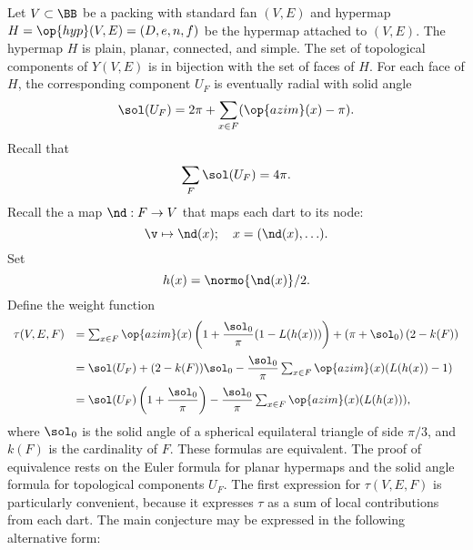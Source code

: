 Let $V\subset \BB$ be a packing with
standard fan $(V,E)$ and hypermap $H=\op{hyp}(V,E)=(D,e,n,f)$
be the hypermap attached to $(V,E)$.
The hypermap $H$ is plain, planar, connected, and simple.
The set of topological components of $Y(V,E)$ is in bijection with
the set of faces of $H$.  
%
For each face of $H$, the corresponding component $U_F$
is eventually radial with solid
angle
%
\begin{displaymath}
\sol(U_F) = 2\pi + \sum_{x\in F} (\op{azim}(x) -\pi).
\end{displaymath}
Recall that
\begin{displaymath}\sum_{F} \sol(U_F) = 4\pi.\end{displaymath}
Recall the a map $\nd:F\to V$ that maps each dart to its node:
\begin{displaymath}
\v \mapsto \nd(x); \quad   x = (\nd(x),\ldots).
\end{displaymath}
Set 
\begin{displaymath}h(x) = \normo{\nd(x)}/2.\end{displaymath}
Define the weight function
\begin{equation}
\begin{array}{lll}
  \tau(V,E,F) &=\sum_{x\in F} \op{azim}(x)
  \left(1 + \dfrac{\sol_0}{\pi}(1- L(h(x)))\right) 
  + \left(\pi+{\sol_0}\right) (2- k(F))\vspace{6pt}\\
  &= \sol(U_F) + (2- k(F))\sol_0 - \dfrac{\sol_0}{\pi}
\sum_{x\in F}\op{azim}(x) (L(h(x)) - 1)\vspace{6pt}\\
  &= \sol(U_F) \left( 1 + \dfrac{\sol_0}{\pi}\right) 
- \dfrac{\sol_0}{\pi} \sum_{x\in F} \op{azim}(x)(L(h(x))),\\
\end{array}
\end{equation}
where $\sol_0$ is the solid angle of a spherical equilateral triangle
of side $\pi/3$, and $k(F)$ is the cardinality of $F$.
% 
These formulas are equivalent.  The proof of equivalence rests on the
Euler formula for planar hypermaps and the solid angle formula for
topological components $U_F$.  The first expression for $\tau(V,E,F)$
is particularly convenient, because it expresses $\tau$ as a sum of
local contributions from each dart.  %
%
%
The main conjecture may be expressed in the following alternative
form:

